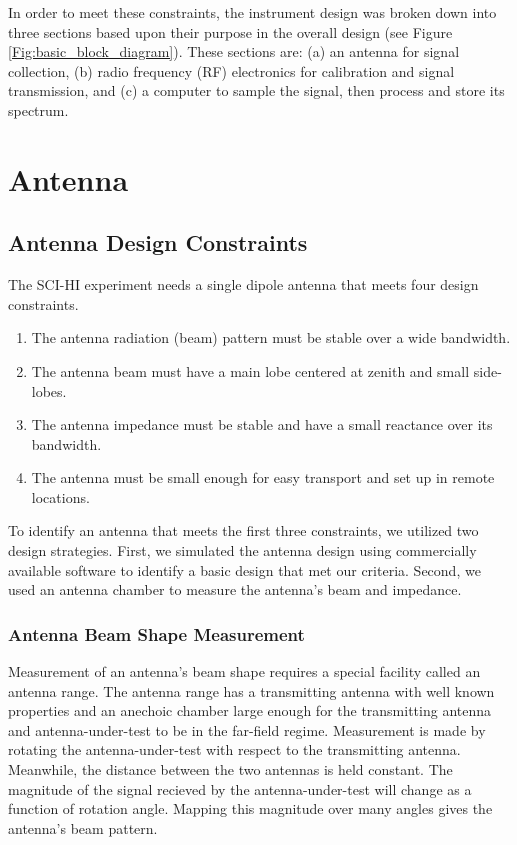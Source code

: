 In order to meet these constraints, the instrument design was broken down into three sections based upon their purpose in the overall design (see Figure \ref{Fig:basic_block_diagram}). These sections are: (a) an antenna for signal collection, (b) radio frequency (RF) electronics for calibration and signal transmission, and (c) a computer to sample the signal, then process and store its spectrum. 



\section{Antenna}


\subsection{Antenna Design Constraints}

The SCI-HI experiment needs a single dipole antenna that meets four design constraints. 

\begin{enumerate}

\item The antenna radiation (beam) pattern must be stable over a wide bandwidth. 

\item The antenna beam must have a main lobe centered at zenith and small side-lobes. 

\item The antenna impedance must be stable and have a small reactance over its bandwidth. 

\item The antenna must be small enough for easy transport and set up in remote locations. 

\end{enumerate}

To identify an antenna that meets the first three constraints, we utilized two design strategies. First, we simulated the antenna design using commercially available software to identify a basic design that met our criteria. Second, we used an antenna chamber to measure the antenna's beam and impedance. 

\subsubsection{Antenna Beam Shape Measurement}

Measurement of an antenna's beam shape requires a special facility called an antenna range. The antenna range has a transmitting antenna with well known properties and an anechoic chamber large enough for the transmitting antenna and antenna-under-test to be in the far-field regime. Measurement is made by rotating the antenna-under-test with respect to the transmitting antenna. Meanwhile, the distance between the two antennas is held constant. The magnitude of the signal recieved by the antenna-under-test will change as a function of rotation angle. Mapping this magnitude over many angles gives the antenna's beam pattern. 

